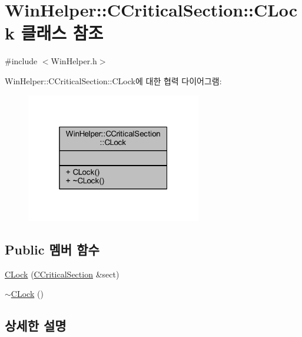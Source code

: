 \hypertarget{class_win_helper_1_1_c_critical_section_1_1_c_lock}{}\section{Win\+Helper\+:\+:C\+Critical\+Section\+:\+:C\+Lock 클래스 참조}
\label{class_win_helper_1_1_c_critical_section_1_1_c_lock}


{\ttfamily \#include $<$Win\+Helper.\+h$>$}



Win\+Helper\+:\+:C\+Critical\+Section\+:\+:C\+Lock에 대한 협력 다이어그램\+:\nopagebreak
\begin{figure}[H]
\begin{center}
\leavevmode
\includegraphics[width=217pt]{class_win_helper_1_1_c_critical_section_1_1_c_lock__coll__graph}
\end{center}
\end{figure}
\subsection*{Public 멤버 함수}
\begin{DoxyCompactItemize}
\item 
\mbox{\hyperlink{class_win_helper_1_1_c_critical_section_1_1_c_lock_a68cee1cb129d83775f678a4bde96c049}{C\+Lock}} (\mbox{\hyperlink{class_win_helper_1_1_c_critical_section}{C\+Critical\+Section}} \&sect)
\item 
\mbox{\hyperlink{class_win_helper_1_1_c_critical_section_1_1_c_lock_abbd6d830a932e4ba03735171d39afe81}{$\sim$\+C\+Lock}} ()
\end{DoxyCompactItemize}


\subsection{상세한 설명}


